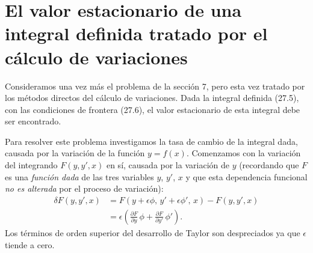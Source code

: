 \documentclass[12pt,a4paper]{book}
\begin{document}
\section{El valor estacionario de una integral definida tratado por el cálculo de variaciones}

Consideramos una vez más el problema de la sección 7, pero esta vez tratado por los métodos directos del cálculo de variaciones. Dada la integral definida (27.5), con las condiciones de frontera (27.6), el valor estacionario de esta integral debe ser encontrado.

Para resolver este problema investigamos la tasa de cambio de la integral dada, causada por la variación de la función $y = f(x)$. Comenzamos con la variación del integrando $F(y, y', x)$ en sí, causada por la variación de $y$ (recordando que $F$ es una \textit{función dada} de las tres variables $y$, $y'$, $x$ y que esta dependencia funcional \textit{no es alterada} por el proceso de variación):
\begin{equation}
\begin{aligned}
\delta F(y, y', x) &= F(y + \epsilon\phi, \, y' + \epsilon\phi', \, x) - F(y, y', x) \\
&= \epsilon \left( \frac{\partial F}{\partial y} \, \phi + \frac{\partial F}{\partial y'} \, \phi' \right).
\end{aligned} \tag{210.1}
\end{equation}
Los términos de orden superior del desarrollo de Taylor son despreciados ya que $\epsilon$ tiende a cero.
\end{document}
